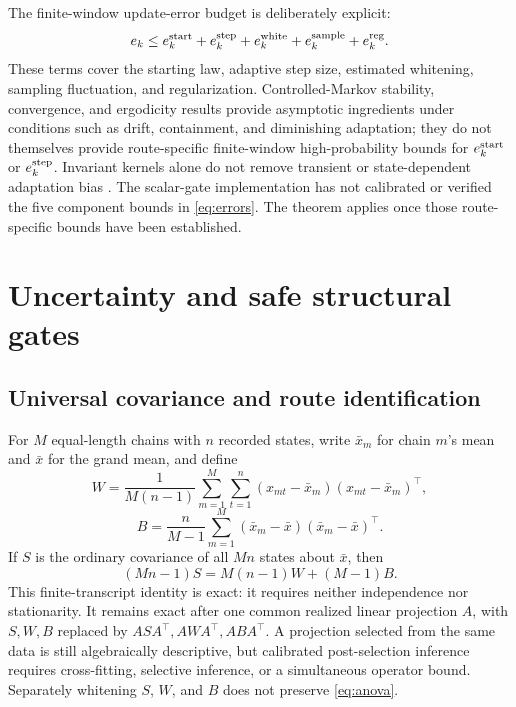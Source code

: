 \documentclass[11pt]{article}
\theoremstyle{plain}
\theoremstyle{definition}
\theoremstyle{remark}
\begin{document}
The finite-window update-error budget is deliberately explicit:
\begin{equation}
 e_k\le e_k^{\rm start}+e_k^{\rm step}+e_k^{\rm white}
          +e_k^{\rm sample}+e_k^{\rm reg}.                   \label{eq:errors}
\end{equation}
These terms cover the starting law, adaptive step size, estimated whitening,
sampling fluctuation, and regularization. Controlled-Markov stability,
convergence, and ergodicity results provide asymptotic ingredients under
conditions such as drift, containment, and diminishing adaptation; they do not
themselves provide route-specific finite-window high-probability bounds for
$e_k^{\rm start}$ or $e_k^{\rm step}$. Invariant kernels alone do not remove
transient or state-dependent adaptation bias
\citep{andrieu2005stability,fort2016convergence,roberts2007coupling}.
The scalar-gate implementation has not calibrated or verified the five
component bounds in \eqref{eq:errors}. The theorem applies once those
route-specific bounds have been established.

\section{Uncertainty and safe structural gates}\label{sec:ident}

\subsection{Universal covariance and route identification}\label{sec:covbridge}

For $M$ equal-length chains with $n$ recorded states, write $\bar x_m$ for
chain $m$'s mean and $\bar x$ for the grand mean, and define
\[
 W=\frac{1}{M(n-1)}\sum_{m=1}^M\sum_{t=1}^n
 (x_{mt}-\bar x_m)(x_{mt}-\bar x_m)^\top,
\]
\[
 B=\frac{n}{M-1}\sum_{m=1}^M
 (\bar x_m-\bar x)(\bar x_m-\bar x)^\top.
\]
If $S$ is the ordinary covariance of all $Mn$ states about $\bar x$, then
\begin{equation}
 (Mn-1)S=M(n-1)W+(M-1)B.                                  \label{eq:anova}
\end{equation}
This finite-transcript identity is exact: it requires neither independence nor
stationarity. It remains exact after one common realized linear projection
$A$, with $S,W,B$ replaced by $ASA^\top,AWA^\top,ABA^\top$. A projection
selected from the same data is still algebraically descriptive, but calibrated
post-selection inference requires cross-fitting, selective inference, or a
simultaneous operator bound. Separately whitening $S$, $W$, and $B$ does not
preserve \eqref{eq:anova}.
\end{document}
